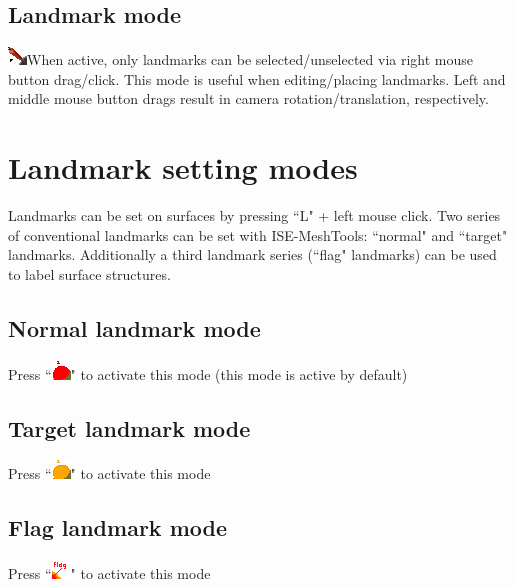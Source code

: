 \subsection{Landmark mode}
  \includegraphics{images/pixmap/Landmarks2.png}When active, only landmarks can be selected/unselected via right mouse button drag/click. This mode is useful when editing/placing landmarks. Left and middle mouse button drags result in camera rotation/translation, respectively.

\section{Landmark setting modes}
Landmarks can be set on surfaces by pressing ``L" + left mouse click. 
Two series of conventional landmarks can be set with ISE-MeshTools: ``normal" and ``target" landmarks. Additionally a third landmark series (``flag" landmarks) can be used to label surface structures. 
\subsection{Normal landmark mode}	
Press ``\includegraphics{images/pixmap/Landmarks4.png}" to activate this mode (this mode is active by default)
\subsection{Target landmark mode}	

Press ``\includegraphics{images/pixmap/Landmarks6.png}"  to activate this mode
\subsection{Flag landmark mode}	

Press ``\includegraphics{images/pixmap/Flag01.png}" to activate this mode
